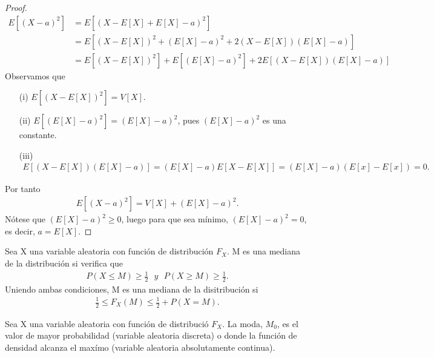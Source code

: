 \begin{proof}
    \begin{align*}
        E[(X - a)^2] & = E[(X - E[X] + E[X] - a)^2]                                   \\
                     & = E[(X - E[X])^2 + (E[X] - a)^2 + 2(X - E[X])(E[X] - a)]       \\
                     & = E[(X - E[X])^2] + E[(E[X] - a)^2] + 2E[(X - E[X])(E[X] - a)]
    \end{align*}
    Observamos que
    \begin{enumerate}
        \item[(i)] $E[(X - E[X])^2] = V[X]$.
        \item[(ii)] $E[(E[X] - a)^2] = (E[X] - a)^2$, pues $(E[X] - a)^2$ es una constante.
        \item[(iii)]
              \begin{align*}
                  E[(X - E[X])(E[X] - a)] = (E[X] - a)E[X - E[X]] = (E[X] - a)(E[x] - E[x]) = 0.
              \end{align*}
    \end{enumerate}
    Por tanto
    \begin{align*}
        E[(X - a)^2] = V[X] + (E[X] - a)^2.
    \end{align*}
    Nótese que $(E[X] - a)^2 \ge 0$, luego para que sea mínimo, $(E[X] - a)^2 = 0$, es decir, $a = E[X]$.
\end{proof}

\begin{defi}[Mediana]
    Sea X una variable aleatoria con función de distribución $F_X$. M es una mediana de la distribución si verifica que
    \begin{align*}
        P(X \leq M) \ge \frac{1}{2} \ \ \ y \ \ \ P(X \ge M) \ge \frac{1}{2}.
    \end{align*}
    Uniendo ambas condiciones, M es una mediana de la disitribución si
    \begin{align*}
        \frac{1}{2} \leq F_X(M) \leq \frac{1}{2} + P(X = M).
    \end{align*}
\end{defi}

\begin{defi}[Moda]
    Sea X una variable aleatoria con función de distribució $F_X$. La moda, $M_0$, es el valor de mayor probabilidad (variable aleatoria discreta) o donde la función de densidad alcanza el maxímo (variable aleatoria absolutamente continua).
\end{defi}

